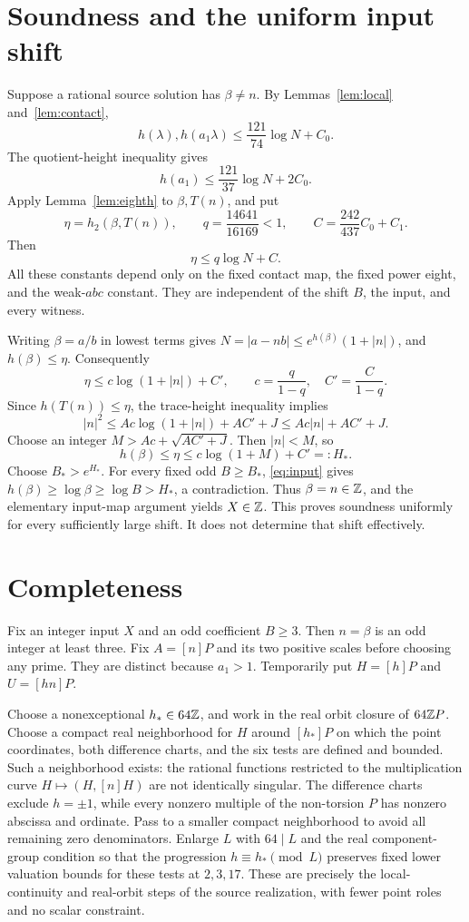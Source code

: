 \documentclass[11pt,a4paper]{article}
\begin{document}
\section{Soundness and the uniform input shift}

Suppose a rational source solution has $\beta\ne n$. By
Lemmas~\ref{lem:local} and~\ref{lem:contact},
\[
 h(\lambda),h(a_1\lambda)\le\frac{121}{74}\log N+C_0.
\]
The quotient-height inequality gives
\[
 h(a_1)\le\frac{121}{37}\log N+2C_0.
\]
Apply Lemma~\ref{lem:eighth} to $\beta,T(n)$, and put
\[
 \eta=h_2(\beta,T(n)),\qquad
 q=\frac{14641}{16169}<1,\qquad
 C=\frac{242}{437}C_0+C_1.
\]
Then
\begin{equation}\label{eq:combined}
                         \eta\le q\log N+C.
\end{equation}
All these constants depend only on the fixed contact map,
the fixed power eight, and the weak-$abc$ constant. They are
independent of the shift $B$, the input, and every witness.

Writing $\beta=a/b$ in lowest terms gives
$N=|a-nb|\le e^{h(\beta)}(1+|n|)$, and $h(\beta)\le\eta$.
Consequently
\[
 \eta\le c\log(1+|n|)+C',\qquad
 c=\frac{q}{1-q},\quad C'=\frac{C}{1-q}.
\]
Since $h(T(n))\le\eta$, the trace-height inequality implies
\[
 |n|^2\le Ac\log(1+|n|)+AC'+J
           \le Ac|n|+AC'+J.
\]
Choose an integer $M>Ac+\sqrt{AC'+J}$. Then $|n|<M$, so
\[
                    h(\beta)\le\eta
                       \le c\log(1+M)+C'=:H_*.
\]
Choose $B_*>e^{H_*}$. For every fixed odd $B\ge B_*$,
\eqref{eq:input} gives $h(\beta)\ge\log\beta\ge\log B>H_*$,
a contradiction. Thus $\beta=n\in\mathbb Z$, and the elementary
input-map argument yields $X\in\mathbb Z$.
This proves soundness uniformly for every sufficiently large shift.
It does not determine that shift effectively.

\section{Completeness}\label{sec:complete}

Fix an integer input $X$ and an odd coefficient $B\ge3$.
Then $n=\beta$ is an odd integer at least three. Fix
$A=[n]P$ and its two positive scales before choosing
any prime. They are distinct because $a_1>1$.
Temporarily put $H=[h]P$ and $U=[hn]P$.

Choose a nonexceptional $h_*\in64\mathbb Z$, and work in the real
orbit closure of $64\mathbb Z P$. Choose a compact real neighborhood
for $H$ around $[h_*]P$ on which the point coordinates, both difference charts,
and the six tests are defined and bounded. Such a neighborhood
exists: the rational functions restricted to the multiplication
curve $H\mapsto(H,[n]H)$ are not identically singular.
The difference charts exclude $h=\pm1$, while every nonzero
multiple of the non-torsion $P$ has nonzero abscissa and ordinate.
Pass to a smaller compact neighborhood to avoid all remaining
zero denominators. Enlarge $L$ with $64\mid L$ and the real
component-group condition so that the progression
$h\equiv h_*\pmod L$
preserves fixed lower valuation bounds for these tests at
$2,3,17$. These are precisely the local-continuity and real-orbit
steps of the source realization, with fewer point roles and no
scalar constraint.
\end{document}
